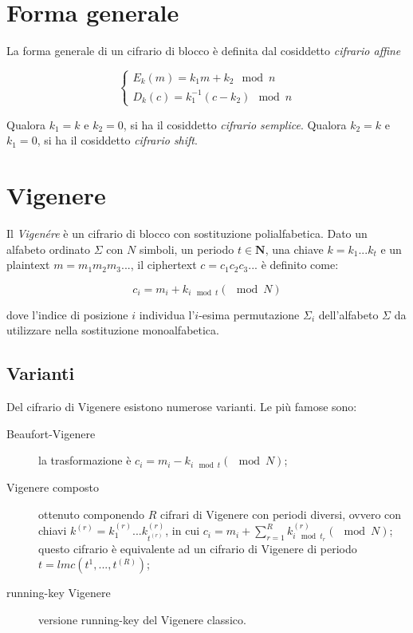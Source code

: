 \section{Forma generale}
La forma generale di un cifrario di blocco è definita dal cosiddetto \textit{cifrario affine}

\begin{equation}
\begin{cases}
  E_{k}(m)=k_{1}m+k_{2} \mod n \\
  D_{k}(c)=k_{1}^{-1}(c-k_{2}) \mod n
\end{cases}
\end{equation}

Qualora $k_{1}=k$ e $k_{2}=0$, si ha il cosiddetto \textit{cifrario semplice}.
Qualora $k_{2}=k$ e $k_{1}=0$, si ha il cosiddetto \textit{cifrario shift}.


\section{Vigenere}
Il \textit{Vigenére} è un cifrario di blocco con sostituzione polialfabetica.
Dato un alfabeto ordinato $\Sigma$ con $N$ simboli, un periodo $t\in\mathbf{N}$, una chiave $k=k_{1}...k_{t}$ e un plaintext $m=m_{1}m_{2}m_{3}...$, il ciphertext $c=c_{1}c_{2}c_{3}...$ è definito come:

\begin{equation}
  c_{i}=m_{i}+k_{i \mod t}(\mod N)
\end{equation}

dove l'indice di posizione $i$ individua l'$i$-esima permutazione $\Sigma_{i}$ dell'alfabeto $\Sigma$ da utilizzare nella sostituzione monoalfabetica.

\subsection{Varianti}
Del cifrario di Vigenere esistono numerose varianti. Le più famose sono:
\begin{description}
  \item[Beaufort-Vigenere] la trasformazione è $c_{i}=m_{i}-k_{i \mod t}(\mod N)$;

  \item[Vigenere composto] ottenuto componendo $R$ cifrari di Vigenere con periodi diversi, ovvero con chiavi $k^{(r)}=k_{1}^{(r)}...k_{t^{(r)}}^{(r)}$, in cui
  $c_{i}=m_{i}+\sum_{r=1}^{R} k_{i \mod t_{r}}^{(r)}(\mod N)$; questo cifrario è equivalente ad un cifrario di Vigenere di periodo $t=lmc(t^{1},...,t^{(R)})$;

  \item[running-key Vigenere] versione running-key del Vigenere classico.
\end{description}

